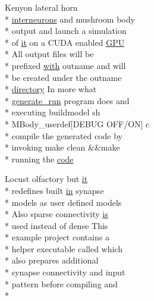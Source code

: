 \begin{DoxyCompactItemize}
Kenyon lateral horn \\*
\hyperlink{userproject_2SynDelay__project_2README_8txt_adf6327d22e2c11a62a22ab5afd4f2b81}{interneurons} and mushroom body \\*
output and launch a simulation \\*
of \hyperlink{userproject_2PoissonIzh__project_2README_8txt_a3e3bbb6c9b14c38757cf273a117e43e8}{it} on a C\+U\+D\+A enabled \hyperlink{modelSpec_8h_a39cb9803524b6f3b783344b2f89867b4}{G\+P\+U} \\*
All output files will be \\*
prefixed \hyperlink{userproject_2OneComp__project_2README_8txt_ace09bb40fbf4457ad9a9340a67a4fa9a}{with} outname and will \\*
be created under the outname \\*
\hyperlink{README_8txt_ae619b68020535fba5ac79522a0d9d1c4}{directory} In more what \\*
\hyperlink{userproject_2MBody__userdef__project_2README_8txt_a320a215d1e27b4de394be70e90d22863}{generate\+\_\+run} program does and \\*
executing buildmodel sh \\*
M\+Body\+\_\+userdef\mbox{[}D\+E\+B\+U\+G O\+F\+F/O\+N\mbox{]} c \\*
compile the generated code by \\*
invoking make clean \&\&make \\*
running the \hyperlink{userproject_2MBody__userdef__project_2README_8txt_aeec4e596748e7c29dd5548dae4c70685}{code}
\item 
Locust olfactory but \hyperlink{userproject_2PoissonIzh__project_2README_8txt_a3e3bbb6c9b14c38757cf273a117e43e8}{it} \\*
redefines built \hyperlink{README_8txt_a148897a6b2cc9cff25af80abb13426b0}{in} synapse \\*
models as user defined models \\*
Also sparse connectivity \hyperlink{userproject_2MBody__userdef__project_2README_8txt_a7b4e6cf78d14ce882cb8ff127e01babd}{is} \\*
used instead of dense This \\*
example project contains a \\*
helper executable called which \\*
also prepares additional \\*
synapse connectivity and input \\*
pattern before compiling and \\*

\end{DoxyCompactItemize}
